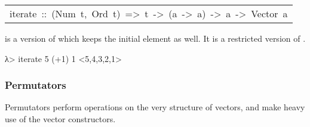 \begin{haddockdesc}
\begin{interactive}
\end{interactive}\par
           

\item[\begin{tabular}{@{}l}
iterate\ ::\ (Num\ t,\ Ord\ t)\ =>\ t\ ->\ (a\ ->\ a)\ ->\ a\ ->\ Vector\ a
\end{tabular}]\haddockbegindoc
{} is a version of  which keeps the initial
 element as well. It is a restricted version of .\par
\begin{interactive}
λ> iterate 5 (+1) 1
<5,4,3,2,1>

\end{interactive}
\end{haddockdesc}
\subsubsection{Permutators}
Permutators perform operations on the very structure of
 vectors, and make heavy use of the vector constructors.\par

